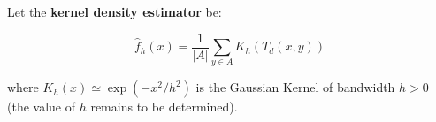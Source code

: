 Let the \textbf{ kernel density estimator} be:

\[   \hat{f}_h(x) = \frac{1}{|A|}\sum_{ y \in A} K_h (T_d(x,y))  \]

 where $K_h(x) \simeq \exp( -x^2/h^2)$ is the Gaussian Kernel of bandwidth $h>0$ (the value of $h$ remains to be determined).


